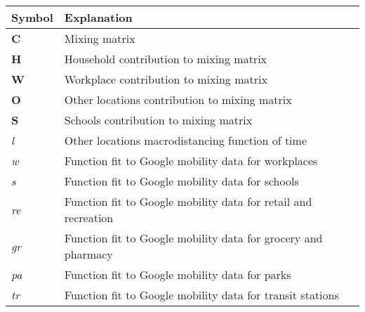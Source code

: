 \begin{table}[ht]
\renewcommand{\baselinestretch}{1}
    	\begin{tabular}{| p{2cm} | p{11.1cm} |}
    	\hline
    	Symbol & Explanation \\
    	\hline
    	\textbf{C} & Mixing matrix \\
    	\textbf{H} & Household contribution to mixing matrix \\
    	\textbf{W} & Workplace contribution to mixing matrix \\
    	\textbf{O} & Other locations contribution to mixing matrix \\
    	\textbf{S} & Schools contribution to mixing matrix \\
    	\textit{l} & Other locations macrodistancing function of time \\
    	\textit{w} & Function fit to Google mobility data for workplaces \\
    	\textit{s} & Function fit to Google mobility data for schools \\
    	\textit{re} & Function fit to Google mobility data for retail and recreation \\
    	\textit{gr} & Function fit to Google mobility data for grocery and pharmacy \\
    	\textit{pa} & Function fit to Google mobility data for parks \\
    	\textit{tr} & Function fit to Google mobility data for transit stations \\
    	\hline
	\end{tabular}
\end{table}